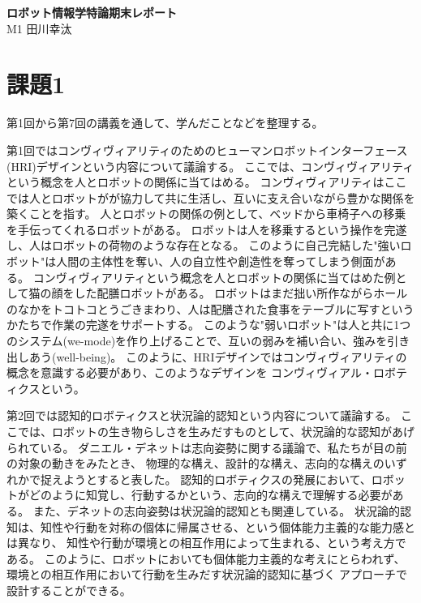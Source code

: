 \documentclass[]{jarticle}          %
\begin{document}

\vspace*{2ex}
\begin{center}
 {\Large \bf ロボット情報学特論期末レポート}\\ %
 \vspace*{5mm}
 {\large M1 田川幸汰}%
\end{center}



\section{課題1}
第1回から第7回の講義を通して、学んだことなどを整理する。

第1回ではコンヴィヴィアリティのためのヒューマンロボットインターフェース(HRI)デザインという内容について議論する。
ここでは、コンヴィヴィアリティという概念を人とロボットの関係に当てはめる。
コンヴィヴィアリティはここでは人とロボットがが協力して共に生活し、互いに支え合いながら豊かな関係を築くことを指す。
人とロボットの関係の例として、ベッドから車椅子への移乗を手伝ってくれるロボットがある。
ロボットは人を移乗するという操作を完遂し、人はロボットの荷物のような存在となる。
このように自己完結した"強いロボット"は人間の主体性を奪い、人の自立性や創造性を奪ってしまう側面がある。
コンヴィヴィアリティという概念を人とロボットの関係に当てはめた例として猫の顔をした配膳ロボットがある。
ロボットはまだ拙い所作ながらホールのなかをトコトコとうごきまわり、人は配膳された食事をテーブルに写すというかたちで作業の完遂をサポートする。
このような"弱いロボット"は人と共に1つのシステム(we-mode)を作り上げることで、互いの弱みを補い合い、強みを引き出しあう(well-being)。
このように、HRIデザインではコンヴィヴィアリティの概念を意識する必要があり、このようなデザインを
コンヴィヴィアル・ロボティクスという。

第2回では認知的ロボティクスと状況論的認知という内容について議論する。
ここでは、ロボットの生き物らしさを生みだすものとして、状況論的な認知があげられている。
ダニエル・デネットは志向姿勢に関する議論で、私たちが目の前の対象の動きをみたとき、
物理的な構え、設計的な構え、志向的な構えのいずれかで捉えようとすると表した。
認知的ロボティクスの発展において、ロボットがどのように知覚し、行動するかという、志向的な構えで理解する必要がある。
また、デネットの志向姿勢は状況論的認知とも関連している。
状況論的認知は、知性や行動を対称の個体に帰属させる、という個体能力主義的な能力感とは異なり、
知性や行動が環境との相互作用によって生まれる、という考え方である。
このように、ロボットにおいても個体能力主義的な考えにとらわれず、環境との相互作用において行動を生みだす状況論的認知に基づく
アプローチで設計することができる。
\end{document}
